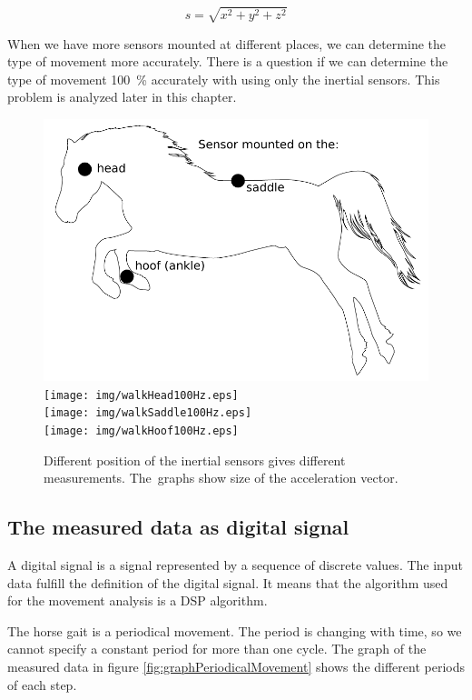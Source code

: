 $$ s = \sqrt{x^{2}+y^{2}+z^{2}} $$

When we have more sensors mounted at different places, we can determine the type of movement more accurately. There is a question if we can determine the type of movement \SI{100}{\%} accurately with using only the inertial sensors. This problem is analyzed later in this chapter.

\begin{figure}
    \centering
    \label{fig:differentSensorPosition}
    \caption{Different position of the inertial sensors gives different measurements. The~graphs show size of the acceleration vector.}
    \includegraphics[scale=0.5]{img/sensorMount.pdf} \\
    \texttt{[image: img/walkHead100Hz.eps]} \\
    \texttt{[image: img/walkSaddle100Hz.eps]} \\
    \texttt{[image: img/walkHoof100Hz.eps]}
\end{figure}

\subsection{The measured data as digital signal}
A digital signal is a signal represented by a sequence of discrete values. \cite{DigitalSignalProcessing} The input data fulfill the definition of the digital signal. It means that the algorithm used for the movement analysis is a \ac{DSP} algorithm.

The horse gait is a periodical movement. The period is changing with time, so we cannot specify a constant period for more than one cycle. The graph of the measured data in figure \ref{fig:graphPeriodicalMovement} shows the different periods of each step.


